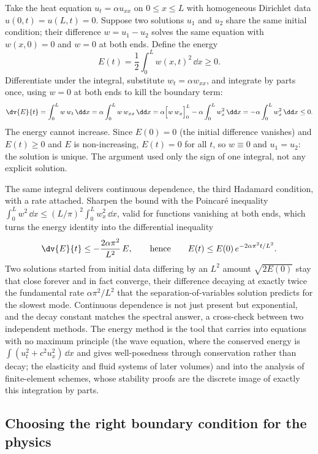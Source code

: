 Take the heat equation $u_{t} = \alpha u_{xx}$ on $0 \leq x \leq L$
with homogeneous Dirichlet data $u(0,t) = u(L,t) = 0$. Suppose two
solutions $u_{1}$ and $u_{2}$ share the same initial condition; their
difference $w = u_{1} - u_{2}$ solves the same equation with
$w(x,0) = 0$ and $w = 0$ at both ends. Define the energy
\[
E(t) = \frac{1}{2}\int_{0}^{L} w(x,t)^{2}\,\dd x \geq 0.
\]
Differentiate under the integral, substitute $w_{t} = \alpha w_{xx}$,
and integrate by parts once, using $w = 0$ at both ends to kill the
boundary term:
\[
\dv{E}{t} = \int_{0}^{L} w\, w_{t}\,\dd x
          = \alpha \int_{0}^{L} w\, w_{xx}\,\dd x
          = \alpha\Bigl[w\, w_{x}\Bigr]_{0}^{L}
          - \alpha\int_{0}^{L} w_{x}^{2}\,\dd x
          = -\alpha \int_{0}^{L} w_{x}^{2}\,\dd x \leq 0.
\]
The energy cannot increase. Since $E(0) = 0$ (the initial difference
vanishes) and $E(t) \geq 0$ and $E$ is non-increasing, $E(t) = 0$ for
all $t$, so $w \equiv 0$ and $u_{1} = u_{2}$: the solution is unique.
The argument used only the sign of one integral, not any explicit
solution.

The same integral delivers continuous dependence, the third Hadamard
condition, with a rate attached. Sharpen the bound with the Poincar\'e
inequality $\int_{0}^{L} w^{2}\,\dd x \leq (L/\pi)^{2}\int_{0}^{L}
w_{x}^{2}\,\dd x$, valid for functions vanishing at both ends, which
turns the energy identity into the differential inequality
\[
\dv{E}{t} \leq -\frac{2\alpha \pi^{2}}{L^{2}}\, E,
\qquad\text{hence}\qquad
E(t) \leq E(0)\, e^{-2\alpha \pi^{2} t/L^{2}}.
\]
Two solutions started from initial data differing by an $L^{2}$ amount
$\sqrt{2E(0)}$ stay that close forever and in fact converge, their
difference decaying at exactly twice the fundamental rate
$\alpha\pi^{2}/L^{2}$ that the separation-of-variables solution
predicts for the slowest mode. Continuous dependence is not just
present but exponential, and the decay constant matches the spectral
answer, a cross-check between two independent methods. The energy
method is the tool that carries into equations with no maximum
principle (the wave equation, where the conserved energy is
$\int (u_{t}^{2} + c^{2}u_{x}^{2})\,\dd x$ and gives well-posedness
through conservation rather than decay; the elasticity and
fluid systems of later volumes) and into the analysis of finite-element
schemes, whose stability proofs are the discrete image of exactly this
integration by parts.

\subsection{Choosing the right boundary condition for the physics}


